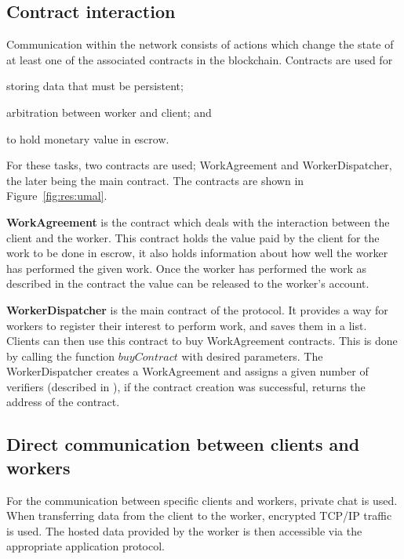 \subsection{Contract interaction}
Communication within the network consists of actions which change the state of at least one of the associated contracts in the blockchain. Contracts are used for
\begin{inparaenum}
\item storing data that must be persistent;
\item arbitration between worker and client; and
\item to hold monetary value in escrow.
\end{inparaenum}
For these tasks, two contracts are used; WorkAgreement and WorkerDispatcher, the later being the main contract. The contracts are shown in Figure~\ref{fig:res:umal}.

\textbf{WorkAgreement} is the contract which deals with the interaction between the client and the worker. This contract holds the value paid by the client for the work to be done in escrow, it also holds information about how well the worker has performed the given work. Once the worker has performed the work as described in the contract the value can be released to the worker's account.

\textbf{WorkerDispatcher} is the main contract of the protocol. It provides a way for workers to register their interest to perform work, and saves them in a list. Clients can then use this contract to buy WorkAgreement contracts. This is done by calling the function $buyContract$ with desired parameters. The WorkerDispatcher creates a WorkAgreement and assigns a given number of verifiers (described in ), if the contract creation was successful, returns the address of the contract.

\subsection{Direct communication between clients and workers}
For the communication between specific clients and workers, private chat is used. When transferring data from the client to the worker, encrypted TCP/IP traffic is used. The hosted data provided by the worker is then accessible via the appropriate application protocol.

